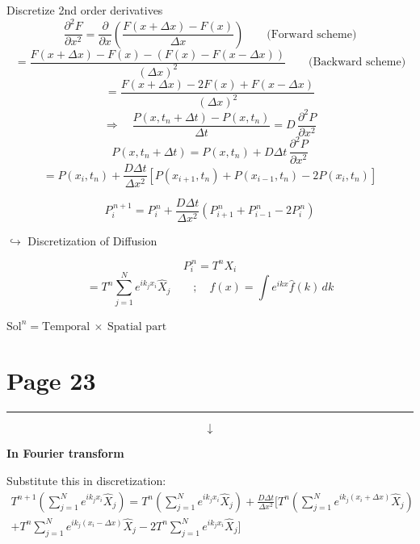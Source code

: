 \documentclass[11pt,a4paper]{article}
\newcommand{\pagehead}[1]{%
  \clearpage
  \section*{Page #1}
  \vspace{-0.6em}
  {\color{black!45}\rule{\linewidth}{0.5pt}}
  \vspace{0.4em}
}
\begin{document}
Discretize 2nd order derivatives
\[
\frac{\partial^2F}{\partial x^2}
=\frac{\partial}{\partial x}\left(\frac{F(x+\Delta x)-F(x)}{\Delta x}\right)
\qquad\text{(Forward scheme)}
\]
\[
=\frac{F(x+\Delta x)-F(x)-(F(x)-F(x-\Delta x))}{(\Delta x)^2}
\qquad\text{(Backward scheme)}
\]
\[
=\frac{F(x+\Delta x)-2F(x)+F(x-\Delta x)}{(\Delta x)^2}
\]
\[
\Rightarrow\quad
\frac{P(x,t_n+\Delta t)-P(x,t_n)}{\Delta t}
=D\,\frac{\partial^2P}{\partial x^2}
\]
\[
P(x,t_n+\Delta t)=P(x,t_n)+D\Delta t\,\frac{\partial^2P}{\partial x^2}
\]
\[
=P(x_i,t_n)+\frac{D\Delta t}{\Delta x^2}
\left[P(x_{i+1},t_n)+P(x_{i-1},t_n)-2P(x_i,t_n)\right]
\]
\begin{handbox}
\[
P_i^{\,n+1}=P_i^{\,n}
+\frac{D\Delta t}{\Delta x^2}
\left(P_{i+1}^{\,n}+P_{i-1}^{\,n}-2P_i^{\,n}\right)
\]
\end{handbox}
\begin{center}
\small$\hookrightarrow$ Discretization of Diffusion
\end{center}
\[
P_i^{\,n}=T^nX_i
\]
\[
=T^n\sum_{j=1}^{N}e^{ik_jx_i}\hat X_j
\qquad ;\quad
f(x)=\int e^{ikx}\hat f(k)\,dk
\]
\begin{handbox}
\centering
$\text{Sol}^n=\text{Temporal}\ \times\ \text{Spatial part}$
\end{handbox}

\pagehead{23}

\[
\downarrow
\]
\begin{center}
\textbf{In Fourier transform}
\end{center}

Substitute this in discretization:
\begin{multline*}
T^{n+1}\left(\sum_{j=1}^{N}e^{ik_jx_i}\hat X_j\right)
=T^n\left(\sum_{j=1}^{N}e^{ik_jx_i}\hat X_j\right)
+\frac{D\Delta t}{\Delta x^2}\Biggl[T^n\left(\sum_{j=1}^{N}
e^{ik_j(x_i+\Delta x)}\hat X_j\right)\\
+T^n\sum_{j=1}^{N}e^{ik_j(x_i-\Delta x)}\hat X_j
-2T^n\sum_{j=1}^{N}e^{ik_jx_i}\hat X_j\Biggr]
\end{multline*}
\end{document}
